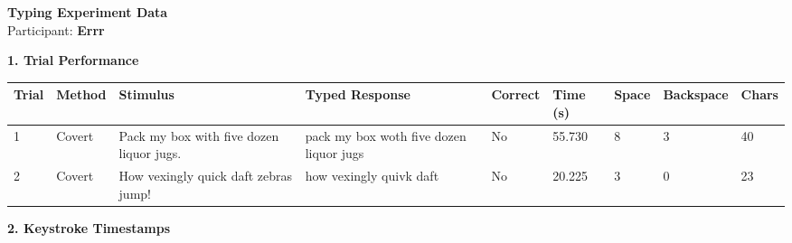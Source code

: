 \documentclass[10pt,a4paper]{article}
\begin{document}

\begin{center}
    {\Large\bfseries Typing Experiment Data}\\
    \vspace{2pt}
    Participant: \textbf{Errr}
\end{center}

\vspace{0.25cm}


\noindent
{\large\bfseries 1. Trial Performance}

\vspace{0.08cm}

\begin{center}
\begin{tabularx}{\textwidth}{
    C{0.45in}
    C{0.65in}
    L{2.35in}
    L{2.55in}
    C{0.65in}
    C{0.65in}
    C{0.55in}
    C{0.75in}
    C{0.55in}
}
\toprule

\textbf{Trial} &
\textbf{Method} &
\textbf{Stimulus} &
\textbf{Typed Response} &
\textbf{Correct} &
\textbf{Time (s)} &
\textbf{Space} &
\textbf{Backspace} &
\textbf{Chars}
\\

\midrule

1 &
Covert &
Pack my box with five dozen liquor jugs. &
pack my  box woth five dozen liquor jugs &
No &
55.730 &
8 &
3 &
40
\\

2 &
Covert &
How vexingly quick daft zebras jump! &
how vexingly quivk daft &
No &
20.225 &
3 &
0 &
23
\\

\bottomrule
\end{tabularx}
\end{center}

\vspace{0.35cm}


\noindent
{\large\bfseries 2. Keystroke Timestamps}

\vspace{0.08cm}
\end{document}
